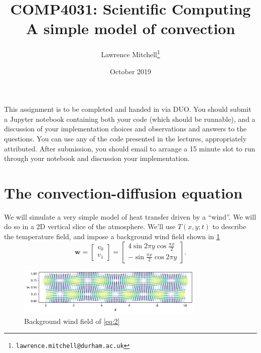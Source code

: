 \documentclass[11pt,a4paper]{article}
\title{COMP4031: Scientific Computing\\A simple model of convection}
\author{Lawrence Mitchell\thanks{\texttt{lawrence.mitchell@durham.ac.uk}}}
\date{October 2019}
\renewcommand{\vec}[1]{\ensuremath{\mathbf{#1}}}
\begin{document}
\maketitle{}

\noindent
This assignment is to be completed and handed in via DUO. You should
submit a Jupyter notebook containing both your code (which should be
runnable), and a discussion of your implementation choices and
observations and answers to the questions. You can use any of the code
presented in the lectures, appropriately attributed. After submission,
you should email to arrange a 15 minute slot to run through your
notebook and discussion your implementation.

\section{The convection-diffusion equation}
\label{sec:part1}

We will simulate a very simple model of heat transfer driven by a
``wind''. We will do so in a 2D vertical slice of the atmosphere.
We'll use $T(x, y; t)$ to describe the temperature field, and impose a
background wind field shown in \cref{fig:wind}
\begin{equation}
  \label{eq:2}
  \vec{w} = \begin{bmatrix}v_0\\v_1\end{bmatrix} = \begin{bmatrix}
    4 \sin 2\pi y \cos \frac{\pi x}{2}\\
    -\sin \frac{\pi x}{2} \cos 2\pi y\end{bmatrix}.
\end{equation}
\begin{figure}[htbp]
  \centering
  \includegraphics[width=0.8\textwidth]{wind-field}
  \caption{Background wind field of \cref{eq:2}}
  \label{fig:wind}
\end{figure}
\end{document}
